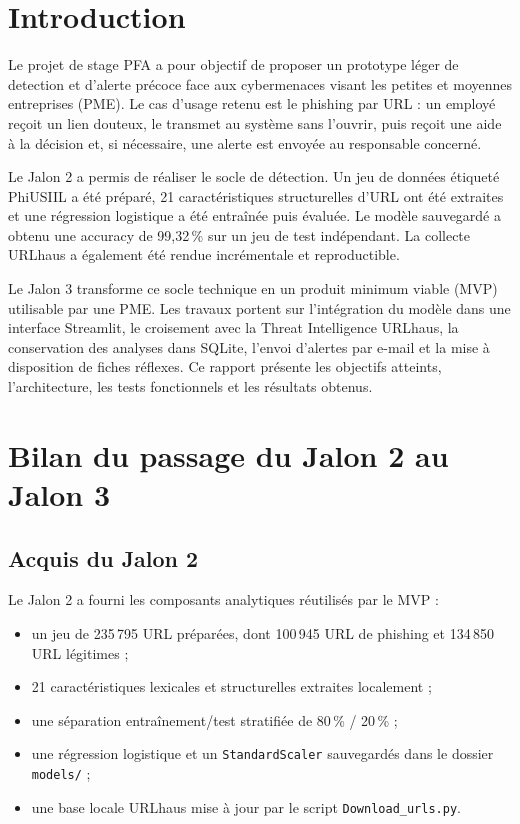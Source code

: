 \documentclass[11pt,a4paper]{report}
\begin{document}
\chapter{Introduction}

Le projet de stage PFA a pour objectif de proposer un prototype léger de
detection et d'alerte précoce face aux cybermenaces visant les petites et
moyennes entreprises (PME). Le cas d'usage retenu est le phishing par URL :
un employé reçoit un lien douteux, le transmet au système sans l'ouvrir, puis
reçoit une aide à la décision et, si nécessaire, une alerte est envoyée au
responsable concerné.

Le Jalon 2 a permis de réaliser le socle de détection. Un jeu de données
étiqueté PhiUSIIL a été préparé, 21 caractéristiques structurelles d'URL ont
été extraites et une régression logistique a été entraînée puis évaluée. Le
modèle sauvegardé a obtenu une accuracy de 99,32\,\% sur un jeu de test
indépendant. La collecte URLhaus a également été rendue incrémentale et
reproductible.

Le Jalon 3 transforme ce socle technique en un produit minimum viable (MVP)
utilisable par une PME. Les travaux portent sur l'intégration du modèle dans
une interface Streamlit, le croisement avec la Threat Intelligence URLhaus,
la conservation des analyses dans SQLite, l'envoi d'alertes par e-mail et la
mise à disposition de fiches réflexes. Ce rapport présente les objectifs
atteints, l'architecture, les tests fonctionnels et les résultats obtenus.

\chapter{Bilan du passage du Jalon 2 au Jalon 3}

\section{Acquis du Jalon 2}

Le Jalon 2 a fourni les composants analytiques réutilisés par le MVP :

\begin{itemize}
  \item un jeu de 235\,795 URL préparées, dont 100\,945 URL de phishing et
        134\,850 URL légitimes ;
  \item 21 caractéristiques lexicales et structurelles extraites localement ;
  \item une séparation entraînement/test stratifiée de 80\,\% / 20\,\% ;
  \item une régression logistique et un \texttt{StandardScaler} sauvegardés
        dans le dossier \texttt{models/} ;
  \item une base locale URLhaus mise à jour par le script
        \texttt{Download\_urls.py}.
\end{itemize}
\end{document}
